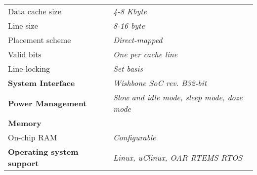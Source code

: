 \documentclass[a4paper,10pt]{article}
\begin{document}
{{{\begin{center}
\begin{tabular}{ll}
\rowcolor{tcD}
Data cache size & \textit{4-8 Kbyte}\\
\rowcolor{tcC}
Line size & \textit{8-16 byte}\\
\rowcolor{tcD}
Placement scheme & \textit{Direct-mapped}\\
\rowcolor{tcC}
Valid bits & \textit{One per cache line}\\
\rowcolor{tcD}
Line-locking & \textit{Set basis}\\
\rowcolor{tcC}
\textbf{System Interface} & \textit{Wishbone SoC rev. B32-bit}\\
\rowcolor{tcD}
\textbf{Power Management} & \textit{Slow and idle mode, sleep mode, doze mode}\\
\rowcolor{tcC}
\textbf{Memory} &  \\
\rowcolor{tcD}
On-chip RAM & \textit{Configurable} \\
\rowcolor{tcC}
\textbf{Operating system
support} & \textit{Linux, uClinux, OAR RTEMS RTOS}\\
\end{tabular}
\end{center}

}%
\vspace{0.7cm}
}


}
\end{document}
